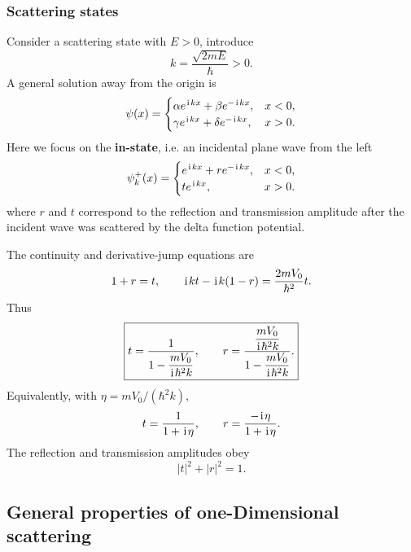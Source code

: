 \subsubsection{Scattering states}
Consider a scattering state with $E>0$, introduce
\begin{equation}
 k=\frac{\sqrt{2mE}}{\hbar}>0.
\end{equation}
A general solution away from the origin is
\begin{equation}
 \psi(x)=
 \begin{cases}
 \alpha e^{\hspace{1pt}\mathrm{i}\hspace{1pt} kx}+\beta e^{-\hspace{1pt}\mathrm{i}\hspace{1pt} kx},&x<0,\\
 \gamma e^{\hspace{1pt}\mathrm{i}\hspace{1pt} kx}+\delta e^{-\hspace{1pt}\mathrm{i}\hspace{1pt} kx},&x>0.
 \end{cases}
\end{equation}
Here we focus on the \textbf{in-state}, i.e. an incidental plane wave from the left
\begin{equation}
 \psi_k^+(x)=
 \begin{cases}
 e^{\hspace{1pt}\mathrm{i}\hspace{1pt} kx}+r e^{-\hspace{1pt}\mathrm{i}\hspace{1pt} kx},&x<0,\\
 t e^{\hspace{1pt}\mathrm{i}\hspace{1pt} kx},&x>0.
 \end{cases}
\end{equation}
where $r$ and $t$ correspond to the reflection and transmission amplitude after the incident wave was scattered by the delta function potential. 

The continuity and derivative-jump equations are
\begin{equation}
 1+r=t,
 \qquad
 \hspace{1pt}\mathrm{i}\hspace{1pt} k t-\hspace{1pt}\mathrm{i}\hspace{1pt} k(1-r)=\frac{2mV_0}{\hbar^2}t.
\end{equation}
Thus
\begin{equation}
 \boxed{
 t=\frac{1}{1-\dfrac{mV_0}{\hspace{1pt}\mathrm{i}\hspace{1pt}\hbar^2k}},
 \qquad
 r=\frac{\dfrac{mV_0}{\hspace{1pt}\mathrm{i}\hspace{1pt}\hbar^2k}}
 {1-\dfrac{mV_0}{\hspace{1pt}\mathrm{i}\hspace{1pt}\hbar^2k}}.}
\end{equation}
Equivalently, with $\eta=mV_0/(\hbar^2k)$,
\begin{equation}
 t=\frac{1}{1+\hspace{1pt}\mathrm{i}\hspace{1pt}\eta},
 \qquad
 r=\frac{-\hspace{1pt}\mathrm{i}\hspace{1pt}\eta}{1+\hspace{1pt}\mathrm{i}\hspace{1pt}\eta}.
\end{equation}
The reflection and transmission amplitudes obey
\begin{equation}
 \boxed{|t|^2+|r|^2=1.}
\end{equation}



\subsection{General properties of one-Dimensional scattering}

